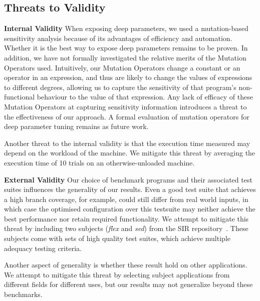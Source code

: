 \subsection{Threats to Validity}

\textbf{Internal Validity}  When exposing deep parameters, we used a mutation-based sensitivity analysis because of its advantages of efficiency and automation. Whether it is the best way to expose deep parameters remains to be proven. In addition, we have not formally investigated the relative merits of the Mutation Operators used. Intuitively, our Mutation Operators change a constant or an operator in an expression, and thus are likely to change the values of expressions to different degrees, allowing us to capture the sensitivity of that program's non-functional behaviour to the value of that expression. Any lack of efficacy of these Mutation Operators at capturing sensitivity information introduces a threat to the effectiveness of our approach. A formal evaluation of mutation operators for deep parameter tuning remains as future work.

Another threat to the internal validity is that the execution time measured
may depend on the workload of the machine. We mitigate this threat by
 averaging the execution time of 10 trials on an otherwise-unloaded machine. 

\textbf{External Validity}  Our choice of benchmark programs and their
associated test suites influences the generality of our results. 
Even a good test suite that achieves a high branch coverage, for
example, could still differ from real world
inputs, in which case the optimised configuration over this testsuite may
neither achieve the best performance nor retain required functionality.
We attempt to mitigate this threat by including two subjects (\emph{flex} and \emph{sed})
from the SIR repository~\cite{SIR2005}. These subjects come with
sets of high quality test suites, which achieve multiple adequacy 
testing criteria.

Another aspect of generality is whether these result hold on other
applications. We attempt to mitigate this threat by selecting subject
applications from different fields for different uses, but our results
may not generalize beyond these benchmarks. 
